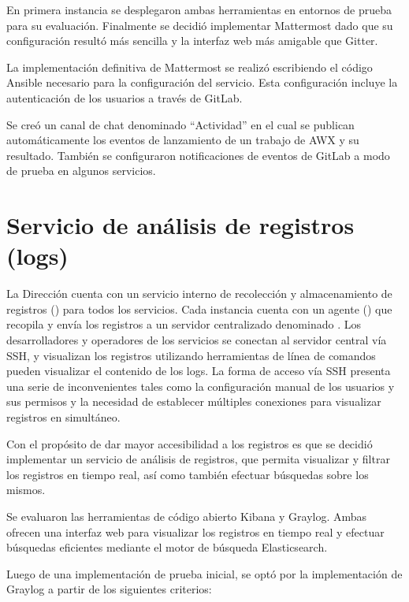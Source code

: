 En primera instancia se desplegaron ambas herramientas en entornos de
prueba para su evaluación. Finalmente se decidió implementar
Mattermost dado que su configuración resultó más sencilla y la
interfaz web más amigable que Gitter.

La implementación definitiva de Mattermost se realizó escribiendo el
código Ansible necesario para la configuración del servicio. Esta
configuración incluye la autenticación de los usuarios a través de
GitLab.

Se creó un canal de chat denominado ``Actividad'' en el cual se publican
automáticamente los eventos de lanzamiento de un trabajo de AWX y su
resultado. También se configuraron notificaciones de eventos de GitLab
a modo de prueba en algunos servicios.

\section{Servicio de análisis de registros (logs)}

La Dirección cuenta con un servicio interno de recolección y
almacenamiento de registros () para todos los
servicios. Cada instancia cuenta con un agente () que
recopila y envía los registros a un servidor centralizado denominado
. Los desarrolladores y operadores de los servicios
se conectan al servidor central  vía SSH, y
visualizan los registros utilizando herramientas de línea de comandos
pueden visualizar el contenido de los logs. La forma de acceso vía SSH
presenta una serie de inconvenientes tales como la configuración
manual de los usuarios y sus permisos y la necesidad de establecer
múltiples conexiones para visualizar registros en simultáneo.

Con el propósito de dar mayor accesibilidad a los registros es que se
decidió implementar un servicio de análisis de registros, que permita
visualizar y filtrar los registros en tiempo real, así como también
efectuar búsquedas sobre los mismos.

Se evaluaron las herramientas de código abierto Kibana y
Graylog. Ambas ofrecen una interfaz web para visualizar los registros
en tiempo real y efectuar búsquedas eficientes mediante el motor de
búsqueda Elasticsearch.

Luego de una implementación de prueba inicial, se optó por la
implementación de Graylog a partir de los siguientes criterios:

